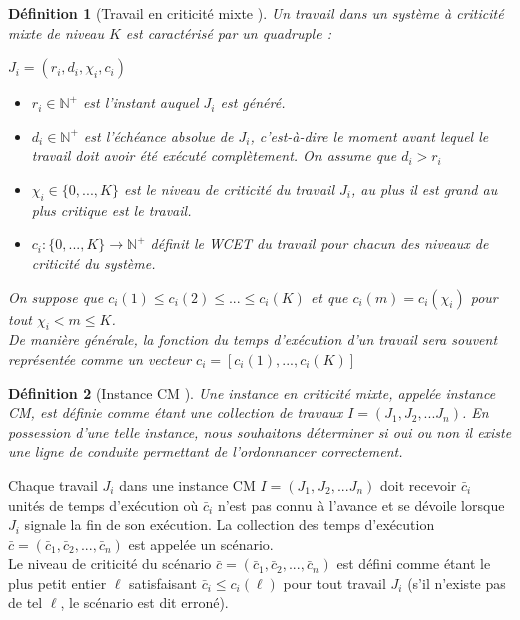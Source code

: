 \documentclass[12pt,a4paper,oneside]{book}
\theoremstyle{break}
\newtheorem{defin}{Définition}[chapter]
\theoremstyle{breakplain}
\begin{document}
\begin{defin}[Travail en criticité mixte \cite{BaruahBDMSS11}]
Un travail dans un système à criticité mixte de niveau $K$ est caractérisé par un quadruple : 
\begin{center}
 $J_i = (r_i, d_i, \chi_i, c_i)$ 
\end{center}
\begin{itemize}
\item $r_i \in \mathbb{N}^{+}$ est l'instant auquel $J_i$ est généré.
\item $d_i \in \mathbb{N}^{+}$ est l'échéance absolue de $J_i$, c'est-à-dire le moment avant lequel le travail doit avoir été exécuté complètement. On assume que $d_i > r_i$
\item $\chi_i \in \{0, ..., K\}$ est le niveau de criticité du travail $J_i$, au plus il est grand au plus critique est le travail.
\item $c_i : \{0, ..., K\} \rightarrow \mathbb{N}^{+}$ définit le WCET du travail pour chacun des niveaux de criticité du système.
\end{itemize}
On suppose que $c_i(1) \leq c_i(2) \leq ... \leq c_i(K)$ et que $c_i(m) = c_i(\chi_i)$ pour tout $\chi_i < m \leq K$.\\
De manière générale, la fonction du temps d'exécution d'un travail sera souvent représentée comme un vecteur $c_i = [c_i(1), ..., c_i(K)]$
\end{defin}

\begin{defin}[Instance CM \cite{baruah2010towards}]
Une instance en criticité mixte, appelée instance CM, est définie comme étant une collection de travaux $I = (J_1, J_2, ... J_n)$. En possession d'une telle instance, nous souhaitons déterminer si oui ou non il existe une ligne de conduite permettant de l'ordonnancer correctement.
\end{defin}

Chaque travail $J_i$ dans une instance CM $I = (J_1, J_2, ... J_n)$ doit recevoir $\bar{c}_i$ unités de temps d'exécution où $\bar{c}_i$ n'est pas connu à l'avance et se dévoile lorsque $J_i$ signale la fin de son exécution. La collection des temps d'exécution $\bar{c} = (\bar{c}_1, \bar{c}_2, ..., \bar{c}_n)$ est appelée un scénario.\\

Le niveau de criticité du scénario $\bar{c} = (\bar{c}_1, \bar{c}_2, ..., \bar{c}_n)$ est défini comme étant le plus petit entier $\ell$ satisfaisant $\bar{c}_i \leq c_i(\ell)$ pour tout travail $J_i$ (s'il n'existe pas de tel $\ell$, le scénario est dit erroné).\\
\end{document}
